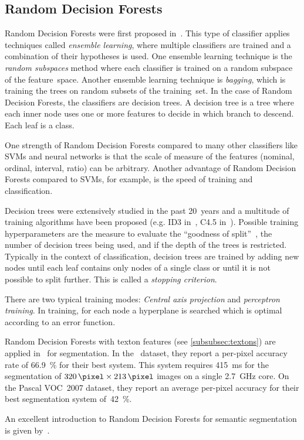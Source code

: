 
\subsection{Random Decision Forests}\label{subsec:random-forests}

Random Decision Forests were first proposed in~\cite{ho1995random}. This type
of classifier applies techniques called \textit{ensemble learning}, where
multiple classifiers are trained and a combination of their hypotheses is
used. One ensemble learning technique is the \textit{random subspaces} method
where each classifier is trained on a random subspace of the feature~space.
Another ensemble learning technique is \textit{bagging}, which is training the
trees on random subsets of the training~set. In the case of Random Decision
Forests, the classifiers are decision trees. A decision tree is a tree where
each inner node uses one or more features to decide in which branch to descend.
Each leaf is a class.

One strength of Random Decision Forests compared to many other classifiers like
\glspl{SVM} and neural networks is that the scale of measure of the features
(nominal, ordinal, interval, ratio) can be arbitrary. Another advantage of
Random Decision Forests compared to \glspl{SVM}, for example, is the speed
of training and classification.

Decision trees were extensively studied in the past 20~years and a
multitude of training algorithms have been proposed (e.g. ID3
in~\cite{quinlan1986induction}, C4.5 in~\cite{quinlan2014c4}). Possible
training hyperparameters are the measure to evaluate the \enquote{goodness of
split}~\cite{raey89empirical}, the number of decision trees being used, and if
the depth of the trees is restricted. Typically in the context of
classification, decision trees are trained by adding new nodes until
each leaf contains only nodes of a single class or until it is not possible to
split further. This is called a \textit{stopping criterion}.

There are two typical training modes: \textit{Central axis projection} and
\textit{perceptron training}. In training, for each node a hyperplane is
searched which is optimal according to an error function.

Random Decision Forests with texton features (see \cref{subsubsec:textons}) are
applied in~\cite{shotton2008semantic} for segmentation. In the~\cite{MSCR-db}
dataset, they report a per-pixel accuracy rate of \SI{66.9}{\percent} for their
best system. This system requires \SI{415}{\milli\second} for the segmentation of
$\SI{320}{\pixel} \times \SI{213}{\pixel}$ images on a single
\SI{2.7}{\giga\hertz} core. On the Pascal VOC~2007 dataset, they report an
average per-pixel accuracy for their best segmentation system
of~\SI{42}{\percent}.

An excellent introduction to Random Decision Forests for semantic segmentation
is given by~\cite{schroff2008object}.
